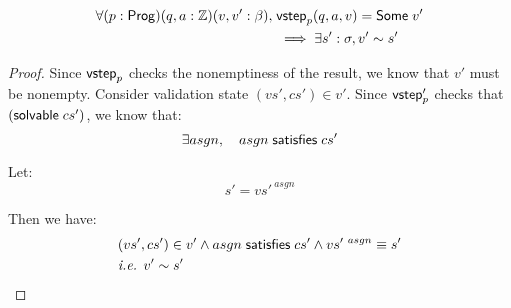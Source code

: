 \begin{lemma}[\ref{eq:rc1}]
\begin{align*}
\forall(p:\mathsf{Prog})(q,a:\mathbb Z)(v,v':\beta),\;&\mathsf{vstep}_p(q,a,v)=\mathsf{Some}\;v'\\
&\implies\exists s':\sigma,v'\sim s'
\end{align*}
\begin{proof}
Since $\mathsf{vstep}_p$ checks the nonemptiness of the result, we know that $v'$ must
be nonempty.  Consider validation state $(vs',cs')\in v'$.  Since $\mathsf{vstep}'_p$
checks that $(\mathsf{solvable}\; cs')$, we know that:
\[\exists asgn,\quad asgn\;\mathsf{satisfies}\;cs'\]

Let:
\[s'=vs'^{~asgn}\]

Then we have:
\begin{align*}
&(vs',cs')\in v'\wedge asgn\;\mathsf{satisfies}\;cs'\wedge vs'^{~asgn}\equiv s'\\
&\textit{i.e. }v'\sim s'
\end{align*}
\end{proof}
\end{lemma}

